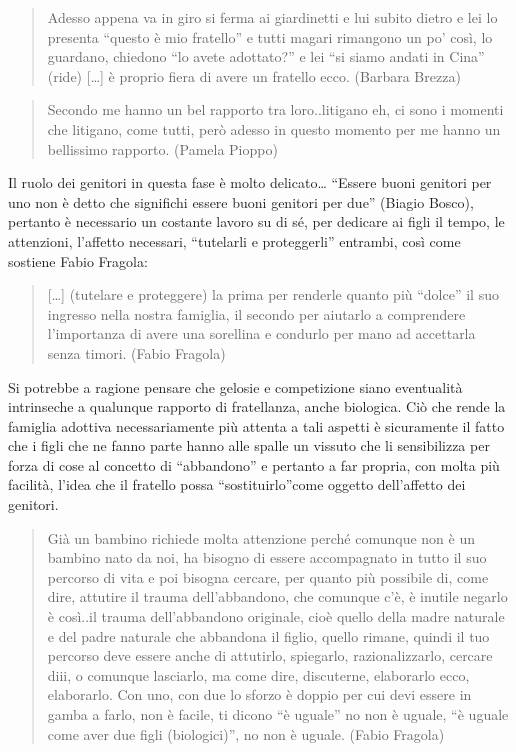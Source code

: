 \documentclass[12pt,oneside,svgnames]{memoir}
\newenvironment{quotationb}%
{\color{maincolor}\begin{leftbar}\begin{quotation}}%
{\end{quotation}\end{leftbar}\ignorespacesafterend}
\begin{document}
\begin{quotationb}
Adesso appena va in giro si ferma ai giardinetti e lui subito dietro e
lei lo presenta ``questo è mio fratello'' e tutti magari rimangono un
po' così, lo guardano, chiedono ``lo avete adottato?'' e lei ``si siamo
andati in Cina'' (ride) {[}\ldots{}{]} è proprio fiera di avere un
fratello ecco. (Barbara Brezza)
\end{quotationb}

\begin{quotationb}
Secondo me hanno un bel rapporto tra loro..litigano eh, ci sono i
momenti che litigano, come tutti, però adesso in questo momento per me
hanno un bellissimo rapporto. (Pamela Pioppo)
\end{quotationb}

Il ruolo dei genitori in questa fase è molto delicato\ldots{} ``Essere
buoni genitori per uno non è detto che significhi essere buoni genitori
per due'' (Biagio Bosco), pertanto è necessario un costante lavoro su di
sé, per dedicare ai figli il tempo, le attenzioni, l'affetto necessari,
``tutelarli e proteggerli'' entrambi, così come sostiene Fabio Fragola:

\begin{quotationb}
{[}\ldots{}{]} (tutelare e proteggere) la prima per renderle quanto più
``dolce'' il suo ingresso nella nostra famiglia, il secondo per aiutarlo
a comprendere l'importanza di avere una sorellina e condurlo per mano ad
accettarla senza timori. (Fabio Fragola)
\end{quotationb}

Si potrebbe a ragione pensare che gelosie e competizione siano
eventualità intrinseche a qualunque rapporto di fratellanza, anche
biologica. Ciò che rende la famiglia adottiva necessariamente più
attenta a tali aspetti è sicuramente il fatto che i figli che ne fanno
parte hanno alle spalle un vissuto che li sensibilizza per forza di cose
al concetto di ``abbandono'' e pertanto a far propria, con molta più
facilità, l'idea che il fratello possa ``sostituirlo''come oggetto
dell'affetto dei genitori.

\begin{quotationb}
Già un bambino richiede molta attenzione perché comunque non è un
bambino nato da noi, ha bisogno di essere accompagnato in tutto il suo
percorso di vita e poi bisogna cercare, per quanto più possibile di,
come dire, attutire il trauma dell'abbandono, che comunque c'è, è
inutile negarlo è così..il trauma dell'abbandono originale, cioè quello
della madre naturale e del padre naturale che abbandona il figlio,
quello rimane, quindi il tuo percorso deve essere anche di attutirlo,
spiegarlo, razionalizzarlo, cercare diii, o comunque lasciarlo, ma come
dire, discuterne, elaborarlo ecco, elaborarlo. Con uno, con due lo
sforzo è doppio per cui devi essere in gamba a farlo, non è facile, ti
dicono ``è uguale'' no non è uguale, ``è uguale come aver due figli
(biologici)'', no non è uguale. (Fabio Fragola)
\end{quotationb}
\end{document}
